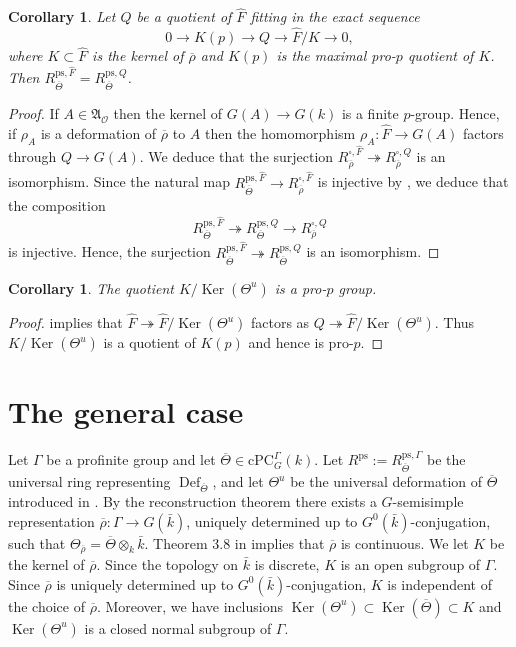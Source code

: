 \documentclass{amsart}
\newtheorem{cor}[prop]{Corollary}
\theoremstyle{definition}
\theoremstyle{remark}
\DeclareMathOperator{\Ker}{Ker}
\DeclareMathOperator{\Def}{Def}
\newcommand{\Aa}{\mathfrak A}
\newcommand{\OO}{\mathcal O}
\newcommand{\rhobar}{\overline{\rho}}
\newcommand{\kbar}{\bar{k}}
\newcommand{\cPC}{\mathrm{cPC}}
\newcommand{\Thetabar}{\overline{\Theta}}
\newcommand{\ps}{\mathrm{ps}}
\newcommand{\Fhat}{\widehat{F}}
\begin{document}
\begin{cor}\label{Q_again}  Let $Q$ be a quotient of $\Fhat$ fitting in the exact sequence
\begin{equation}
0\rightarrow K(p)\rightarrow Q\rightarrow \Fhat/K\rightarrow 0,
\end{equation}
where   $K\subset \Fhat$ is the kernel of $\rhobar$ and $K(p)$ is the maximal pro-$p$ quotient of $K$. Then $R^{\ps, \Fhat}_{\Thetabar}= R^{\ps, Q}_{\Thetabar}$.
\end{cor}
\begin{proof} If  $A\in \Aa_{\OO}$ then 
the kernel of $G(A)\rightarrow G(k)$ is a finite $p$-group. 
Hence, if $\rho_A$ is a deformation of $\rhobar$ to $A$ then 
the homomorphism $\rho_A: \Fhat \rightarrow G(A)$ factors through 
$Q\rightarrow G(A)$. We deduce that the surjection $R^{\square, \Fhat}_{\rhobar}\twoheadrightarrow R^{\square, Q}_{\rhobar}$ is an isomorphism. Since the natural map $R^{\ps, \Fhat}_{\Thetabar}\rightarrow R^{\square, \Fhat}_{\rhobar}$ is injective by , we deduce that the composition 
\begin{equation}
R^{\ps, \Fhat}_{\Thetabar}\twoheadrightarrow R^{\ps, Q}_{\Thetabar}\rightarrow R^{\square, Q}_{\rhobar}
\end{equation}
is injective. Hence, the surjection $R^{\ps, \Fhat}_{\Thetabar}\twoheadrightarrow R^{\ps, Q}_{\Thetabar}$ is an isomorphism.
\end{proof}

\begin{cor}\label{pro_p_Q} The quotient 
$K/\Ker(\Theta^u)$ is a pro-$p$ group.
\end{cor}
\begin{proof}  
implies that $\Fhat\twoheadrightarrow \Fhat/\Ker(\Theta^u)$ factors as $Q\twoheadrightarrow \Fhat/\Ker(\Theta^u)$. Thus $K/\Ker(\Theta^u)$ is a quotient 
of $K(p)$ and hence is pro-$p$.
\end{proof} 

\section{The general case}\label{sec_gen}
Let $\Gamma$ be a profinite group and 
let $\Thetabar\in \cPC^{\Gamma}_G(k)$. 
Let $R^{\ps}:= R^{\ps, \Gamma}_{\Thetabar}$ be the universal ring 
representing $\Def_{\Thetabar}$, and 
let $\Theta^u$ be the universal deformation of $\Thetabar$ introduced in . By the reconstruction theorem \cite[Theorem 3.7]{quast} there 
exists a $G$-semisimple representation 
$\rhobar: \Gamma \rightarrow G(\kbar)$,
uniquely determined up to $G^0(\kbar)$-conjugation, such that $\Theta_{\rhobar}=\Thetabar\otimes_k \kbar$. Theorem 3.8 in \cite{quast} implies that $\rhobar$ is continuous. 
We let $K$ be the kernel of $\rhobar$. 
Since the topology on $\kbar$ is discrete, $K$ is an open subgroup of $\Gamma$. Since $\rhobar$ is uniquely determined up to $G^0(\kbar)$-conjugation, $K$ is independent of the choice of $\rhobar$. Moreover, we have inclusions $\Ker(\Theta^u)\subset \Ker(\Thetabar)\subset K$ and $\Ker(\Theta^u)$ is a closed normal subgroup of $\Gamma$.
\end{document}
